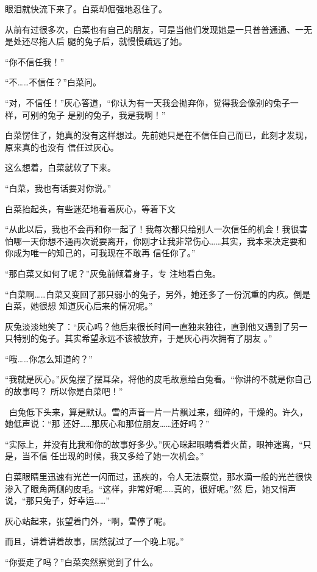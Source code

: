 \documentclass{article}
\begin{document}
\newpage


眼泪就快流下来了。白菜却倔强地忍住了。 

从前有过很多次，白菜也有自己的朋友，可是当他们发现她是一只普普通通、一无是处还尽拖人后
腿的兔子后，就慢慢疏远了她。 


“你不信任我！” 


“不……不信任？”白菜问。 

“对，不信任！”灰心答道，“你认为有一天我会抛弃你，觉得我会像别的兔子一样，可别的兔子
是别的兔子，我是我啊！” 

白菜愣住了，她真的没有这样想过。先前她只是在不信任自己而已，此刻才发现，原来真的也没有
信任过灰心。 


这么想着，白菜就软了下来。 


\newpage

“白菜，我也有话要对你说。” 

白菜抬起头，有些迷茫地看着灰心，等着下文

“从此以后，我也不会再和你一起了！我每次都只给别人一次信任的机会！我很害怕哪一天你想不通再次说要离开，你刚才让我非常伤心……其实，我本来决定要和你成为唯一的知己的，可我现在不敢再
信任你了。” 

“那白菜又如何了呢？”灰兔前倾着身子，专
注地看白兔。 

“白菜啊……白菜又变回了那只弱小的兔子，另外，她还多了一份沉重的内疚。倒是白菜，她很想
知道灰心后来的情况呢。” 

灰兔淡淡地笑了：“灰心吗？他后来很长时间一直独来独往，直到他又遇到了另一只特别的兔子。其实希望永远不该被放弃，于是灰心再次拥有了朋友
。” 

\newpage


“哦……你怎么知道的？” 

“我就是灰心。”灰兔摆了摆耳朵，将他的皮毛故意给白兔看。“你讲的不就是你自己的故事吗？
所以你是白菜吧！” 

 白兔低下头来，算是默认。雪的声音一片一片飘过来，细碎的，干燥的。许久，她低声说：“那
还好……那灰心和那位朋友……还好吗？” 

“实际上，并没有比我和你的故事好多少。”灰心眯起眼睛看着火苗，眼神迷离，“只是，当不信
任出现的时候，我又多给了她一次机会。” 

白菜眼睛里迅速有光芒一闪而过，迅疾的，令人无法察觉，那水滴一般的光芒很快渗入了眼角两侧的皮毛。“这样，非常好呢……真的，很好呢。”然
后，她又悄声说，“那只兔子，好幸运……” 

灰心站起来，张望着门外，“啊，雪停了呢。

\newpage
而且，讲着讲着故事，居然就过了一个晚上呢。” 


“你要走了吗？”白菜突然察觉到了什么。 
\end{document}
